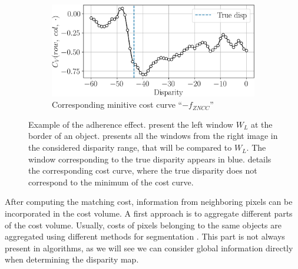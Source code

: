 \begin{figure}
    \begin{subfigure}[t]{\linewidth}
        \centering
        \includegraphics[width=\linewidth]{Images/Chap_1/adherence_cost_curve.png}
        \caption{Corresponding minitive cost curve ``$-f_{ZNCC}$''}
        \label{fig:adherence_cost_curve}
    \end{subfigure}
    \caption{Example of the adherence effect.  present the left window $W_L$ at the border of an object.  presents all the windows from the right image in the considered disparity range, that will be compared to $W_L$. The window corresponding to the true disparity appears in blue.  details the corresponding cost curve, where the true disparity does not correspond to the minimum of the cost curve.}
    \label{fig:adherence_window}
\end{figure}

After computing the matching cost, information from neighboring pixels can be incorporated in the cost volume. A first approach is to aggregate different parts of the cost volume. Usually, costs of pixels belonging to the same objects are aggregated using different methods for segmentation \cite{ke_zhang_cross-based_2009, ji_superpixel_2021}. This part is not always present in algorithms, as we will see we can consider global information directly when determining the disparity map.

